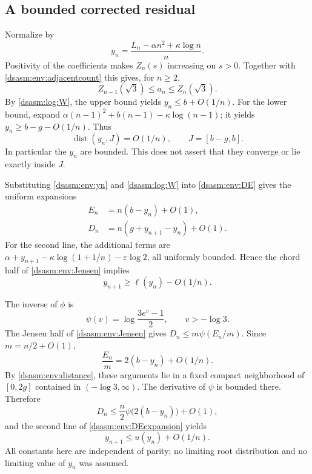 \documentclass[11pt,letterpaper]{article}
\theoremstyle{remark}\newtheorem{remark}[theorem]{Remark}
\newcommand{\eps}{\varepsilon}\newcommand{\HH}{\mathcal H}\newcommand{\one}{\mathbf1}
\DeclareMathOperator{\dist}{dist}
\begin{document}
\subsection{A bounded corrected residual}
Normalize by
\begin{equation}\label{dsasm:env:yn}
 y_n=\frac{L_n-\alpha n^2+\kappa\log n}{n}.
\end{equation}
Positivity of the coefficients makes $Z_n(s)$ increasing on $s>0$.
Together with \eqref{dsasm:env:adjacentcount} this gives, for $n\ge2$,
\begin{equation}\label{dsasm:env:coarse}
 Z_{n-1}(\sqrt3)\le a_n\le Z_n(\sqrt3).
\end{equation}
By \eqref{dsasm:log:W}, the upper bound yields $y_n\le b+O(1/n)$.
For the lower bound, expand
$\alpha(n-1)^2+b(n-1)-\kappa\log(n-1)$; it yields
$y_n\ge b-g-O(1/n)$. Thus
\begin{equation}\label{dsasm:env:distance}
 \dist(y_n,J)=O(1/n),\qquad J=[b-g,b].
\end{equation}
In particular the $y_n$ are bounded. This does not assert that they
converge or lie exactly inside $J$.

Substituting \eqref{dsasm:env:yn} and \eqref{dsasm:log:W} into \eqref{dsasm:env:DE} gives the uniform
expansions
\begin{equation}\label{dsasm:env:DEexpansion}
\begin{split}
 E_n&=n(b-y_n)+O(1),\\
 D_n&=n(g+y_{n+1}-y_n)+O(1).
\end{split}
\end{equation}
For the second line, the additional terms are
$\alpha+y_{n+1}-\kappa\log(1+1/n)-\eps\log2$, all uniformly
bounded. Hence the chord half of \eqref{dsasm:env:Jensen} implies
\begin{equation}\label{dsasm:env:lowerrec}
 y_{n+1}\ge\ell(y_n)-O(1/n).
\end{equation}

The inverse of $\phi$ is
\[
 \psi(v)=\log\frac{3e^v-1}{2},\qquad v>-\log3.
\]
The Jensen half of \eqref{dsasm:env:Jensen} gives
$D_n\le m\psi(E_n/m)$. Since $m=n/2+O(1)$,
\[
 \frac{E_n}{m}=2(b-y_n)+O(1/n).
\]
By \eqref{dsasm:env:distance}, these arguments lie in a fixed compact
neighborhood of $[0,2g]$ contained in $(-\log3,\infty)$.
The derivative of $\psi$ is bounded there. Therefore
\[
 D_n\le\frac n2\psi\bigl(2(b-y_n)\bigr)+O(1),
\]
and the second line of \eqref{dsasm:env:DEexpansion} yields
\begin{equation}\label{dsasm:env:upperrec}
 y_{n+1}\le u(y_n)+O(1/n).
\end{equation}
All constants here are independent of parity; no limiting root
distribution and no limiting value of $y_n$ was assumed.
\end{document}
